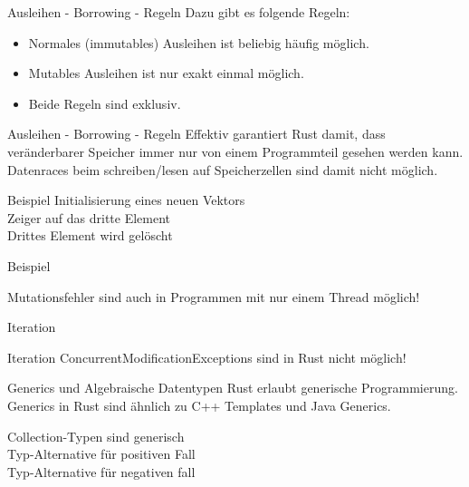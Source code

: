 \documentclass{beamer}
\begin{document}
\begin{frame}{Ausleihen - Borrowing - Regeln}
	Dazu gibt es folgende Regeln:
	\begin{itemize}
		\item Normales (immutables) Ausleihen ist beliebig häufig möglich.
		\item Mutables Ausleihen ist nur exakt einmal möglich.
		\item Beide Regeln sind exklusiv.
	\end{itemize}
\end{frame}

\begin{frame}{Ausleihen - Borrowing - Regeln}
	Effektiv garantiert Rust damit, dass veränderbarer Speicher immer nur von einem Programmteil gesehen werden kann.
	Datenraces beim schreiben/lesen auf Speicherzellen sind damit nicht möglich.
\end{frame}

\begin{frame}{Beispiel}
	 Initialisierung eines neuen Vektors\\
	 Zeiger auf das dritte Element\\
	 Drittes Element wird gelöscht


\end{frame}

\begin{frame}{Beispiel}

	Mutationsfehler sind auch in Programmen mit nur einem Thread möglich!
\end{frame}

\begin{frame}{Iteration}
\end{frame}

\begin{frame}{Iteration}
	ConcurrentModificationExceptions sind in Rust nicht möglich!
\end{frame}

\begin{frame}{Generics und Algebraische Datentypen}
	Rust erlaubt generische Programmierung. Generics in Rust sind ähnlich zu C++ Templates und Java Generics.

	 Collection-Typen sind generisch\\
	 Typ-Alternative für positiven Fall\\
	 Typ-Alternative für negativen fall
\end{frame}
\end{document}
